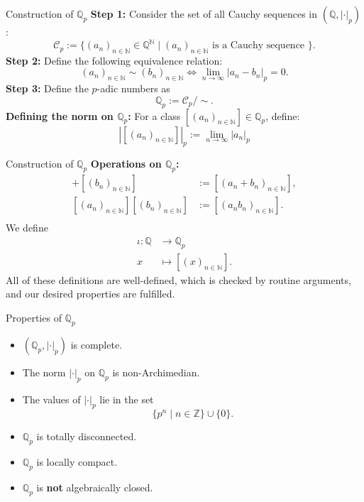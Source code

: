 \documentclass{beamer}
\newcommand{\Q}{\mathbb{Q}}
\newcommand{\N}{\mathbb{N}}
\begin{document}
\begin{frame}{Construction of $\Q_p$}
\textbf{Step 1:} Consider the set of all Cauchy sequences in $(\mathbb{Q}, |\cdot|_p)$:
\[
\mathcal{C}_p := \{ (a_n)_{n \in \mathbb{N}} \in \mathbb{Q}^\N \mid (a_n)_{n \in \N} \text{ is a Cauchy sequence }\}.
\]
\pause
\textbf{Step 2:} Define the following equivalence relation:
\[
(a_n)_{n \in \N} \sim (b_n)_{n \in \N} \iff \lim_{n \to \infty} |a_n - b_n|_p = 0.
\]
\pause
\textbf{Step 3:} Define the $p$-adic numbers as
\[
\mathbb{Q}_p := \mathcal{C}_p /\sim.
\]
\pause
\textbf{Defining the norm on $\mathbb{Q}_p$:}
For a class $[(a_n)_{n \in \N}] \in \mathbb{Q}_p$, define:
\[
|[(a_n)_{n \in \N}]|_p := \lim_{n \to \infty} |a_n|_p
\]
\end{frame}

\begin{frame}{Construction of $\Q_p$}
\textbf{Operations on $\Q_p$:}
\begin{align*}
    [(a_n)_{n \in \N}] + [(b_n)_{n \in \N}] &:= [(a_n + b_n)_{n \in \N}], \\
    [(a_n)_{n \in \N}][(b_n)_{n \in \N}] &:= [(a_nb_n)_{n \in \N}]. \\
\end{align*}
\pause
We define 
\begin{align*}
    \iota \colon \Q &\to \Q_p \\
    x &\mapsto [(x)_{n \in \N}].
\end{align*}
\pause 
All of these definitions are well-defined, which is checked by routine arguments, and our desired properties are fulfilled.
\end{frame}

\begin{frame}{Properties of $\Q_p$}
    \begin{itemize}
        \item $(\Q_p, |\cdot|_p)$ is complete.
        \pause
        \item The norm $|\cdot|_p$ on $\Q_p$ is non-Archimedian.
        \pause
        \item The values of $|\cdot|_p$ lie in the set 
        \begin{equation*}
            \{p^n \mid n \in \mathbb{Z}\} \cup \{0\}.
        \end{equation*}
        \pause 
        \item $\Q_p$ is totally disconnected. 
        \pause 
        \item $\Q_p$ is locally compact.
        \pause 
        \item $\Q_p$ is \textbf{not} algebraically closed.
    \end{itemize}
\end{frame}
\end{document}
